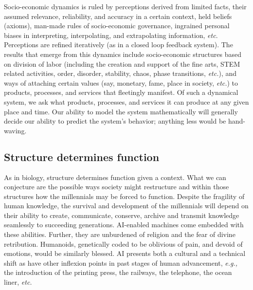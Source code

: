 \begin{multicols}{2}
Socio-economic dynamics is ruled by perceptions derived from limited facts, their assumed relevance, reliability, and accuracy in a certain context, held beliefs (axioms), man-made rules of socio-economic governance, ingrained personal biases in interpreting, interpolating, and extrapolating information, \textit{etc}. Perceptions are refined iteratively (as in a closed loop feedback system). The results that emerge from this dynamics include socio-economic structures based on division of labor (including the creation and support of the fine arts, STEM related activities, order, disorder, stability, chaos, phase transitions, \textit{etc.}), and ways of attaching certain values (say, monetary, fame, place in society, \textit{etc.}) to products, processes, and services that fleetingly manifest. Of such a dynamical system, we ask what products, processes, and services it can produce at any given place and time. Our ability to model the system mathematically will generally decide our ability to predict the system's behavior; anything less would be hand-waving.

\subsection*{Structure determines function}

As in biology, structure determines function given a context. What we can conjecture are the possible ways society might restructure and within those structures how the millennials may be forced to function. Despite the fragility of human knowledge, the survival and development of the millennials will depend on their ability to create, communicate, conserve, archive and transmit knowledge seamlessly to succeeding generations. AI-enabled machines come embedded with these abilities. Further, they are unburdened of religion and the fear of divine retribution. Humanoids, genetically coded to be oblivious of pain, and devoid of emotions, would be similarly blessed. AI presents both a cultural and a technical shift as have other inflexion points in past stages of human advancement, \textit{e.g.,} the introduction of the printing press, the railways, the telephone, the ocean liner, \textit{etc.} 


\end{multicols}
